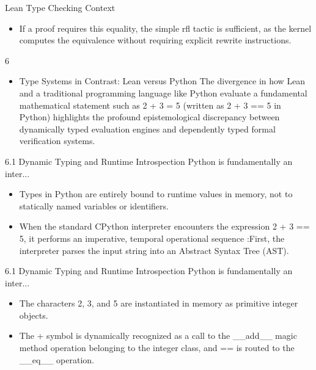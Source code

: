 \documentclass[10pt]{beamer}
\begin{document}
\begin{frame}{Lean Type Checking Context}
\begin{itemize}\setlength{\itemsep}{1.5em}
  \item If a proof requires this equality, the simple rfl tactic is sufficient, as the kernel computes the equivalence without requiring explicit rewrite instructions.
\end{itemize}
\end{frame}

\begin{frame}{6}
\begin{itemize}\setlength{\itemsep}{1.5em}
  \item Type Systems in Contrast: Lean versus Python The divergence in how Lean and a traditional programming language like Python evaluate a fundamental mathematical statement such as 2 + 3 = 5 (written as 2 + 3 == 5 in Python) highlights the profound epistemological discrepancy between dynamically typed evaluation engines and dependently typed formal verification systems.
\end{itemize}
\end{frame}

\begin{frame}{6.1 Dynamic Typing and Runtime Introspection Python is fundamentally an inter...}
\begin{itemize}\setlength{\itemsep}{1.5em}
  \item Types in Python are entirely bound to runtime values in memory, not to statically named variables or identifiers.
  \item When the standard CPython interpreter encounters the expression 2 + 3 == 5, it performs an imperative, temporal operational sequence :First, the interpreter parses the input string into an Abstract Syntax Tree (AST).
\end{itemize}
\end{frame}

\begin{frame}{6.1 Dynamic Typing and Runtime Introspection Python is fundamentally an inter...}
\begin{itemize}\setlength{\itemsep}{1.5em}
  \item The characters 2, 3, and 5 are instantiated in memory as primitive integer objects.
  \item The + symbol is dynamically recognized as a call to the \_\_add\_\_ magic method operation belonging to the integer class, and == is routed to the \_\_eq\_\_ operation.
\end{itemize}
\end{frame}
\end{document}
